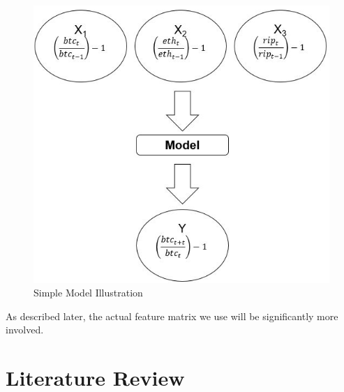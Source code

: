 \documentclass[12pt,twoside]{article}
\begin{document}
\begin{figure}[H]
	\begin{center}
		\includegraphics[scale=0.75]{simple_model_graph}
		\caption{Simple Model Illustration}
		\label{fig:simple_model_graph}
	\end{center}
\end{figure}

As described later, the actual feature matrix we use will be significantly more involved.

\section{Literature Review}
\end{document}
